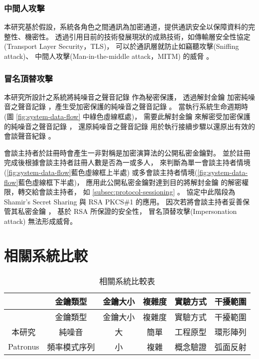\subsubsection{中間人攻擊}

    本研究基於假設，系統各角色之間通訊為加密通道，提供通訊安全以保障資料的完整性、機密性。
透過引用目前的技術發展現狀的成熟技術，如傳輸層安全性協定(Transport Layer Security，TLS)，
可以於通訊層就防止如竊聽攻擊(Sniffing attack)、
中間人攻擊(Man-in-the-middle attack，MITM) 的威脅 \cite{rfc5246}\cite{rfc8446}。


\subsubsection{冒名頂替攻擊}

    本研究所設計之系統將純噪音之聲音記錄 \DEFrecN 作為秘密保護，
透過解封金鑰 \DEFunsealKey 加密純噪音之聲音記錄 \DEFrecN，產生受加密保護的純噪音之聲音記錄 \DEFrecP。
當執行系統生命週期時(圖 \ref{fig:system-data-flow} 中綠色虛線框處)，
需要此解封金鑰 \DEFunsealKey 來解密受加密保護的純噪音之聲音記錄 \DEFrecP，
還原純噪音之聲音記錄 \DEFrecN 用於執行接續步驟以還原出有效的會談聲音紀錄 \DEFrecREV。

    會談主持者於註冊時會產生一非對稱是加密演算法的公開私密金鑰對。
並於註冊完成後根據會談主持者註冊人數是否為一或多人，
來判斷為單一會談主持者情境(\ref{fig:system-data-flow}藍色虛線框上半處)
或多會談主持者情境(\ref{fig:system-data-flow}藍色虛線框下半處)，
應用此公開私密金鑰對達到目的將解封金鑰 \DEFunsealKey 的解密權限，轉交給會談主持者，
如 \ref{subsec:protocol-sessioning} 。
協定中此階段為 Shamir's Secret Sharing \cite{shamir1979share}
與 RSA PKCS\#1 \cite{rfc8017} 的應用。
因次若將會談主持者妥善保管其私密金鑰 \DEFprivateKey，
基於 RSA \cite{rfc8017} 所保證的安全性，
冒名頂替攻擊(Impersonation attack) 無法形成威脅。


\section{相關系統比較}\label{sec:comparison}

\begin{longtable}{|c|c|c|c|c|c|}
    \caption{相關系統比較表}\label{table:comparison} \\
    \hline
    & 金鑰類型 & 金鑰大小 & 複雜度 & 實驗方式 & 干擾範圍 \\
    \hline
    \endfirsthead

    & 金鑰類型 & 金鑰大小 & 複雜度 & 實驗方式 & 干擾範圍 \\
    \hline
    \endhead

    \hline
    \endfoot

    \hline
    \endlastfoot

    本研究 &
    純噪音 &
    大 &
    簡單 &
    工程原型 &
    環形陣列 \\

    \hline

    Patronus\cite{li2020patronus} &
    頻率模式序列 &
    小 &
    複雜 &
    概念驗證 &
    弧面反射 \\

\end{longtable}